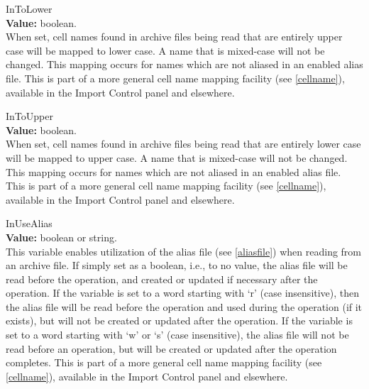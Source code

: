 \begin{description}
\item{\et InToLower}\\
{\bf Value:} boolean.\\
When set, cell names found in archive files being read that are
entirely upper case will be mapped to lower case.  A name that is
mixed-case will not be changed.  This mapping occurs for names which
are not aliased in an enabled alias file.  This is part of a more
general cell name mapping facility (see \ref{cellname}), available in
the {\cb Import Control} panel and elsewhere.

\item{\et InToUpper}\\
{\bf Value:} boolean.\\
When set, cell names found in archive files being read that are
entirely lower case will be mapped to upper case.  A name that is
mixed-case will not be changed.  This mapping occurs for names which
are not aliased in an enabled alias file.  This is part of a more
general cell name mapping facility (see \ref{cellname}), available in
the {\cb Import Control} panel and elsewhere.

\item{\et InUseAlias}\\
{\bf Value:} boolean or string.\\
This variable enables utilization of the alias file (see
\ref{aliasfile}) when reading from an archive file.  If simply set as
a boolean, i.e., to no value, the alias file will be read before the
operation, and created or updated if necessary after the operation. 
If the variable is set to a word starting with `{\vt r}' (case
insensitive), then the alias file will be read before the operation
and used during the operation (if it exists), but will not be created
or updated after the operation.  If the variable is set to a word
starting with `{\vt w}' or `{\vt s}' (case insensitive), the alias
file will not be read before an operation, but will be created or
updated after the operation completes.  This is part of a more general
cell name mapping facility (see \ref{cellname}), available in the {\cb
Import Control} panel and elsewhere.


\end{description}
